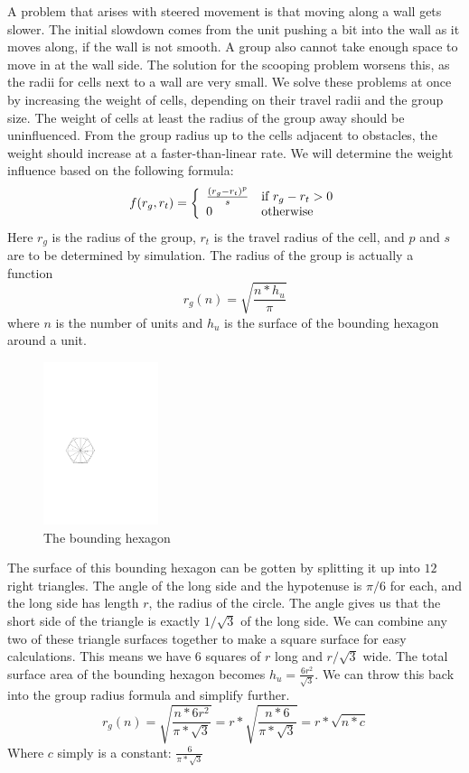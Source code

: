 A problem that arises with steered movement is that moving along a wall gets slower. The initial slowdown comes from the unit pushing a bit into the wall as it moves along, if the wall is not smooth. A group also cannot take enough space to move in at the wall side. The solution for the scooping problem worsens this, as the radii for cells next to a wall are very small. We solve these problems at once by increasing the weight of cells, depending on their travel radii and the group size. The weight of cells at least the radius of the group away should be uninfluenced. From the group radius up to the cells adjacent to obstacles, the weight should increase at a faster-than-linear rate. We will determine the weight influence based on the following formula:
$$f(r_g, r_t) = \left\{\begin{array}{l l}
					\frac{(r_g - r_t)^p}{s} & \text{if } r_g - r_t > 0\\
					0 & \text{otherwise}
                \end{array}\right.
                $$
Here $r_g$ is the radius of the group, $r_t$ is the travel radius of the cell, and $p$ and $s$ are to be determined by simulation. The radius of the group is actually a function $$r_g(n) = \sqrt{\frac{n * h_u}{\pi}}$$ where $n$ is the number of units and $h_u$ is the surface of the bounding hexagon around a unit.
\begin{figure}
\includegraphics[width=0.30\textwidth]{images/bounding_hexagon.pdf}
\caption{The bounding hexagon}
\end{figure} 

The surface of this bounding hexagon can be gotten by splitting it up into $12$ right triangles. The angle of the long side and the hypotenuse is $\pi / 6$ for each, and the long side has length $r$, the radius of the circle. The angle gives us that the short side of the triangle is exactly $1/\sqrt{3}$ of the long side. We can combine any two of these triangle surfaces together to make a square surface for easy calculations. This means we have $6$ squares of $r$ long and $r/\sqrt{3}$ wide. The total surface area of the bounding hexagon becomes $h_u = \frac{6r^2}{\sqrt{3}}$. We can throw this back into the group radius formula and simplify further. $$r_g(n) = \sqrt{\frac{n * 6r^2}{\pi * \sqrt{3}}} = r * \sqrt{\frac{n * 6}{\pi * \sqrt{3}}} = r * \sqrt{n*c}$$ Where $c$ simply is a constant: $\frac{6}{\pi * \sqrt{3}}$ 

